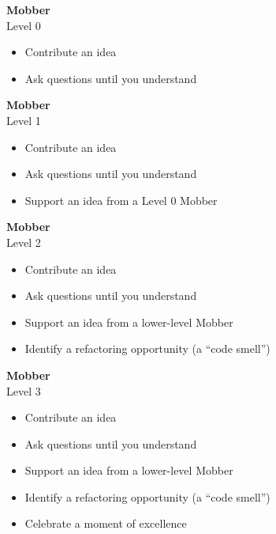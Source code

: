 \documentclass[20pt]{extarticle}
\begin{document}
\newenvironment{role}[2]
{
\begin{centering}
  \textbf{\large{#1}}\\
  Level #2\\
\end{centering}
\begin{itemize}
}
{
\end{itemize}
\pagebreak
}

\begin{role}{Mobber}{0}
  \item Contribute an idea
  \item Ask questions until you understand
\end{role}

\begin{role}{Mobber}{1}
  \item Contribute an idea
  \item Ask questions until you understand
  \item Support an idea from a Level 0 Mobber
\end{role}

\begin{role}{Mobber}{2}
  \item Contribute an idea
  \item Ask questions until you understand
  \item Support an idea from a lower-level Mobber
  \item Identify a refactoring opportunity (a ``code smell'')
\end{role}

\begin{role}{Mobber}{3}
  \item Contribute an idea
  \item Ask questions until you understand
  \item Support an idea from a lower-level Mobber
  \item Identify a refactoring opportunity (a ``code smell'')
  \item Celebrate a moment of excellence
\end{role}
\end{document}
